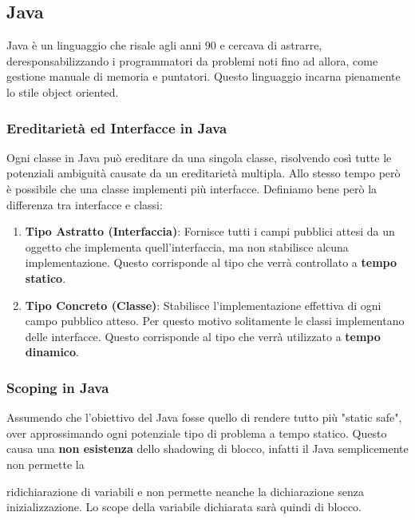 \documentclass{article}
\begin{document}
\subsection{Java}

Java è un linguaggio che risale agli anni $90$ e cercava di astrarre, deresponsabilizzando i programmatori da problemi noti fino ad allora, come gestione manuale di memoria e puntatori. Questo linguaggio incarna pienamente lo stile object oriented.

\subsubsection{Ereditarietà ed Interfacce in Java}

Ogni classe in Java può ereditare da una singola classe, risolvendo così tutte le potenziali ambiguità causate da un ereditarietà multipla. Allo stesso tempo però è possibile che una classe implementi più interfacce. Definiamo bene però la differenza tra interfacce e classi:

\begin{enumerate}
    \item \textbf{Tipo Astratto (Interfaccia)}: Fornisce tutti i campi pubblici attesi da un oggetto che implementa quell'interfaccia, ma non stabilisce alcuna implementazione. Questo corrisponde al tipo che verrà controllato a \textbf{tempo statico}.
    \item \textbf{Tipo Concreto (Classe)}: Stabilisce l'implementazione effettiva di ogni campo pubblico atteso. Per questo motivo solitamente le classi implementano delle interfacce. Questo corrisponde al tipo che verrà utilizzato a \textbf{tempo dinamico}.
    
\end{enumerate}

\newpage

\subsubsection{Scoping in Java}

Assumendo che l'obiettivo del Java fosse quello di rendere tutto più "static safe", over approssimando ogni potenziale tipo di problema a tempo statico.
Questo causa una \textbf{non esistenza} dello shadowing di blocco, infatti il Java semplicemente non permette la 

ridichiarazione di variabili e non permette neanche la dichiarazione senza inizializzazione. Lo scope della variabile dichiarata sarà quindi di blocco.
\end{document}
